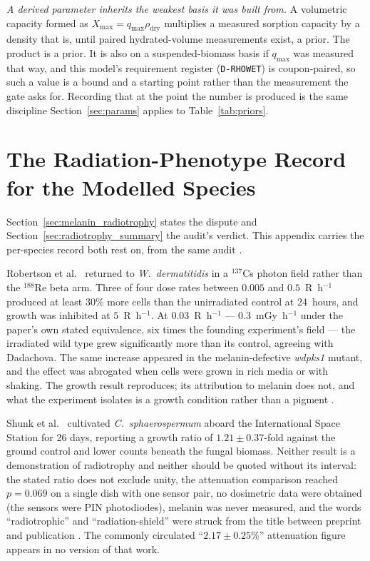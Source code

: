\documentclass[11pt]{article}
\begin{document}
\emph{A derived parameter inherits the weakest basis it was built from.} A volumetric capacity
formed as $X_{\max} = q_{\max}\rho_{\mathrm{dry}}$ multiplies a measured sorption capacity by a
density that is, until paired hydrated-volume measurements exist, a prior. The product is a
prior. It is also on a suspended-biomass basis if $q_{\max}$ was measured that way, and this
model's requirement register (\texttt{D-RHOWET}) is coupon-paired, so such a value is a bound and
a starting point rather than the measurement the gate asks for. Recording that at the point the
number is produced is the same discipline Section~\ref{sec:params} applies to Table~\ref{tab:priors}.

\section{The Radiation-Phenotype Record for the Modelled Species}
\label{app:radiotrophy}
\label{sec:radiotrophy_status}

Section~\ref{sec:melanin_radiotrophy} states the dispute and Section~\ref{sec:radiotrophy_summary}
the audit's verdict. This appendix carries the per-species record both rest on, from the same
audit \cite{audit2026}.


Robertson et al.\ \cite{robertson2012} returned to \textit{W.\ dermatitidis} in a
$^{137}$Cs photon field rather than the $^{188}$Re beta arm. Three of four dose rates
between $0.005$ and $0.5$~R~h$^{-1}$ produced at least 30\% more cells than the
unirradiated control at 24~hours, and growth was inhibited at $5$~R~h$^{-1}$. At
$0.03$~R~h$^{-1}$ --- $0.3$~mGy~h$^{-1}$ under the paper's own stated equivalence, six
times the founding experiment's field --- the irradiated wild type grew significantly more
than its control, agreeing with Dadachova. The same increase appeared in the
melanin-defective \textit{wdpks1} mutant, and the effect was abrogated when cells were
grown in rich media or with shaking. The growth result reproduces; its attribution to
melanin does not, and what the experiment isolates is a growth condition rather than a
pigment \cite{audit2026}.

Shunk et al.\ \cite{shunk2022} cultivated \textit{C.\ sphaerospermum} aboard the International
Space Station for 26 days, reporting a growth ratio of $1.21 \pm 0.37$-fold against the ground
control and lower counts beneath the fungal biomass. Neither result is a demonstration of
radiotrophy and neither should be quoted without its interval: the stated ratio does not exclude
unity, the attenuation comparison reached $p = 0.069$ on a single dish with one sensor pair, no
dosimetric data were obtained (the sensors were PIN photodiodes), melanin was never measured, and
the words ``radiotrophic'' and ``radiation-shield'' were struck from the title between preprint and
publication \cite{audit2026}. The commonly circulated ``$2.17 \pm 0.25\%$'' attenuation figure
appears in no version of that work.
\end{document}
